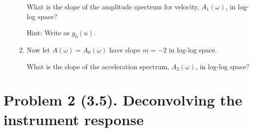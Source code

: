 \documentclass[11pt,titlepage,fleqn]{article}
\begin{document}
\begin{enumerate}
\begin{enumerate}
What is the slope of the amplitude spectrum for velocity, $A_1(\omega)$, in log-log space?

Hint: Write  as $g_0(u)$.

\item Now let $A(\omega) = A_0(\omega)$ have slope $m=-2$ in log-log space.

What is the slope of the acceleration spectrum, $A_2(\omega)$, in log-log space?

\end{enumerate}

\end{enumerate}


\section*{Problem 2 (3.5). Deconvolving the instrument response}
\end{document}
